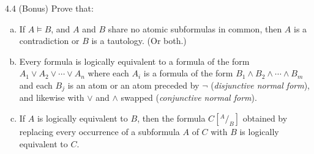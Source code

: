 \documentclass{article}
\begin{document}
\begin{prob}{4.4 (Bonus)}
    Prove that:
    \begin{enumerate}[a)]
    \item If $A \models B$, and $A$ and $B$ share no atomic subformulas in common, then $A$ is a contradiction or $B$ is a tautology. (Or both.)
    \item Every formula is logically equivalent to a formula of the form $A_1 \vee A_2 \vee \cdots \vee A_n$ where each $A_i$ is a formula of the form $B_1 \wedge B_2 \wedge \cdots \wedge B_m$ and each $B_j$ is an atom or an atom preceded by $\neg$ (\emph{disjunctive normal form}), and likewise with $\vee$ and $\wedge$ swapped (\emph{conjunctive normal form}).
    \item If $A$ is logically equivalent to $B$, then the formula $C\left[^{A} / _{B} \right]$ obtained by replacing every occurrence of a subformula $A$ of $C$ with $B$ is logically equivalent to $C$.
    \end{enumerate}
\end{prob}
\end{document}
